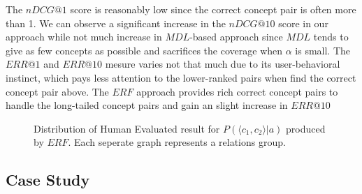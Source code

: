 The $nDCG@1$ score is reasonably low since the correct concept pair is often more than 1.
We can observe a significant increase in the $nDCG@10$ score in our approach while not much increase in $MDL$-based approach since $MDL$ tends to give as few concepts as possible and sacrifices the coverage when $\alpha$ is small.
The $ERR@1$ and $ERR@10$ mesure varies not that much due to its user-behavioral instinct, which pays less attention to the lower-ranked pairs when find the correct concept pair above.
The $ERF$ approach provides rich correct concept pairs to handle the long-tailed concept pairs and gain an slight increase in $ERR@10$

\begin{figure*}[!htb]
\centering
{}
\caption{Distribution of Human Evaluated result for $P(\langle c_1,c_2 \rangle|a)$ produced by $ERF$. \small Each seperate graph represents a relations group.}
\label{fig:eva_violin_group}
\end{figure*}



\subsection{Case Study}

